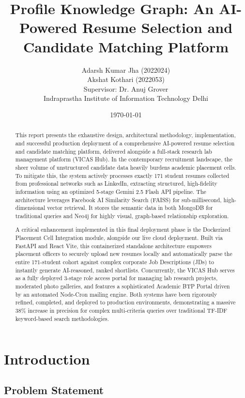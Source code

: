 \documentclass[12pt,a4paper]{report}
\title{Profile Knowledge Graph: An AI-Powered Resume Selection and Candidate Matching Platform}
\author{
    Adarsh Kumar Jha (2022024)\\
    Akshat Kothari (2022053)\\
    \vspace{0.5cm}
    Supervisor: Dr. Anuj Grover\\
    \vspace{0.5cm}
    Indraprastha Institute of Information Technology Delhi
}
\date{\today}
\begin{document}
\maketitle

\begin{abstract}
This report presents the exhaustive design, architectural methodology, implementation, and successful production deployment of a comprehensive AI-powered resume selection and candidate matching platform, delivered alongside a full-stack research lab management platform (VICAS Hub). In the contemporary recruitment landscape, the sheer volume of unstructured candidate data heavily burdens academic placement cells. To mitigate this, the system actively processes exactly 171 student resumes collected from professional networks such as LinkedIn, extracting structured, high-fidelity information using an optimized 5-stage Gemini 2.5 Flash API pipeline. The architecture leverages Facebook AI Similarity Search (FAISS) for sub-millisecond, high-dimensional vector retrieval. It stores the semantic data in both MongoDB for traditional queries and Neo4j for highly visual, graph-based relationship exploration. 

A critical enhancement implemented in this final deployment phase is the Dockerized Placement Cell Integration module, alongside our live cloud deployment. Built via FastAPI and React Vite, this containerized standalone architecture empowers placement officers to securely upload new resumes locally and automatically parse the entire 171-student cohort against complex corporate Job Descriptions (JDs) to instantly generate AI-reasoned, ranked shortlists. Concurrently, the VICAS Hub serves as a fully deployed 3-stage role access portal for managing lab research projects, moderated photo galleries, and features a sophisticated Academic BTP Portal driven by an automated Node-Cron mailing engine. Both systems have been rigorously refined, completed, and deployed to production environments, demonstrating a massive 38\% increase in precision for complex multi-criteria queries over traditional TF-IDF keyword-based search methodologies.
\end{abstract}

\tableofcontents
\listoffigures
\listoftables

\chapter{Introduction}

\section{Problem Statement}
\end{document}
